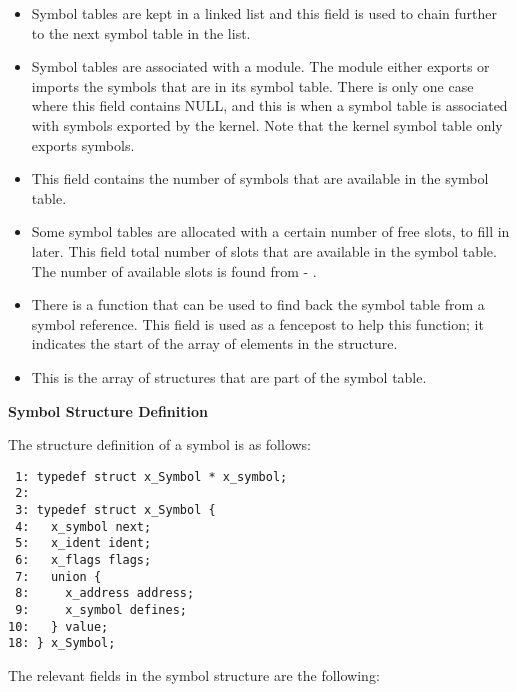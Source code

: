 \begin{itemize}
\item {} Symbol tables are kept in a linked
list and this field is used to chain further to the next symbol table in the
list.

\item {} Symbol tables are associated
with a module. The module either exports or imports the symbols that are in
its symbol table. There is only one case where this field contains NULL, and
this is when a symbol table is associated with symbols exported by the
kernel. Note that the kernel symbol table only exports symbols.

\item {} This field contains the
number of symbols that are available in the symbol table.

\item {} Some symbol tables are
allocated with a certain number of free slots, to fill in later. This field
total number of slots that are available in the symbol table. The number of
available slots is found from  - .

\item {} There is a function
 that can be used to find back the symbol table
from a symbol reference. This field is used as a fencepost to help this
function; it indicates the start of the array of  elements
in the  structure.

\item {} This is the array of
 structures that are part of the symbol table.
\end{itemize}

\textbf{Symbol Structure Definition}

The structure definition of a symbol is as follows:

\bcode
\begin{verbatim}
 1: typedef struct x_Symbol * x_symbol;
 2:
 3: typedef struct x_Symbol {
 4:   x_symbol next;
 5:   x_ident ident;
 6:   x_flags flags;
 7:   union {
 8:     x_address address;
 9:     x_symbol defines;
10:   } value;
18: } x_Symbol;
\end{verbatim}
\ecode

The relevant fields in the symbol structure are the following:

